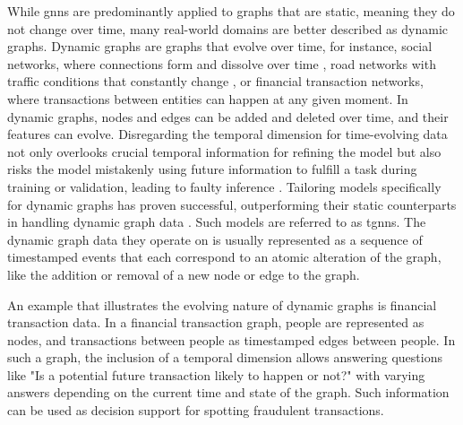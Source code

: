 While \glspl{gnn} are predominantly applied to graphs that are static, meaning they do not change over time, many real-world domains are better described as dynamic graphs. Dynamic graphs are graphs that evolve over time, for instance, social networks, where connections form and dissolve over time \cite{rossi_temporal_2020, souza_provably_2022}, road networks with traffic conditions that constantly change \cite{zhao_t-gcn_2020}, or financial transaction networks, where transactions between entities can happen at any given moment. In dynamic graphs, nodes and edges can be added and deleted over time, and their features can evolve. Disregarding the temporal dimension for time-evolving data not only overlooks crucial temporal information for refining the model \cite{xu_inductive_2020} but also risks the model mistakenly using future information to fulfill a task during training or validation, leading to faulty inference \cite{xu_inductive_2020}. Tailoring models specifically for dynamic graphs has proven successful, outperforming their static counterparts in handling dynamic graph data \cite{ma_streaming_2018, makarov_temporal_2021, rossi_temporal_2020, trivedi_dyrep_2019, xu_inductive_2020, souza_provably_2022}. Such models are referred to as \glspl{tgnn}. The dynamic graph data they operate on is usually represented as a sequence of timestamped events that each correspond to an atomic alteration of the graph, like the addition or removal of a new node or edge to the graph.

An example that illustrates the evolving nature of dynamic graphs is financial transaction data. In a financial transaction graph, people are represented as nodes, and transactions between people as timestamped edges between people. In such a graph, the inclusion of a temporal dimension allows answering questions like "Is a potential future transaction likely to happen or not?" with varying answers depending on the current time and state of the graph. Such information can be used as decision support for spotting fraudulent transactions.

